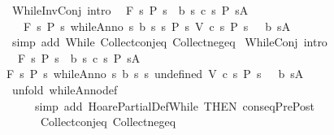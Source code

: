 \begin{isabellebody}
\endisatagproof
{\isafoldproof}%
%
\isadelimproof
\isanewline
%
\endisadelimproof
\isanewline
{}\isamarkupfalse%
\ WhileInvConj\ {\isacharbrackleft}intro{\isacharquery}{\isacharbrackright}{\isacharcolon}\isanewline
\ \ {\isachardoublequoteopen}{\isasymGamma}{\isacharcomma}{\isasymTheta}{\isasymturnstile}\isactrlbsub {\isacharslash}F\isactrlesub \ {\isacharbraceleft}s{\isachardot}\ P\ s\ {\isasymand}\ b\ s{\isacharbraceright}\ c\ {\isacharbraceleft}s{\isachardot}\ P\ s{\isacharbraceright}{\isacharcomma}A\isanewline
\ \ {\isasymLongrightarrow}\ {\isasymGamma}{\isacharcomma}{\isasymTheta}{\isasymturnstile}\isactrlbsub {\isacharslash}F\isactrlesub \ {\isacharbraceleft}s{\isachardot}\ P\ s{\isacharbraceright}\ {\isacharparenleft}whileAnno\ {\isacharbraceleft}s{\isachardot}\ b\ s{\isacharbraceright}\ {\isacharbraceleft}s{\isachardot}\ P\ s{\isacharbraceright}\ V\ c{\isacharparenright}\ {\isacharbraceleft}s{\isachardot}\ P\ s\ {\isasymand}\ {\isasymnot}\ b\ s{\isacharbraceright}{\isacharcomma}A{\isachardoublequoteclose}\isanewline
%
\isadelimproof
\ \ %
\endisadelimproof
%
\isatagproof
{}\isamarkupfalse%
\ {\isacharparenleft}simp\ add{\isacharcolon}\ While\ Collect{\isacharunderscore}conj{\isacharunderscore}eq\ Collect{\isacharunderscore}neg{\isacharunderscore}eq{\isacharparenright}%
\endisatagproof
{\isafoldproof}%
%
\isadelimproof
\isanewline
%
\endisadelimproof
\isanewline
{}\isamarkupfalse%
\ WhileConj\ {\isacharbrackleft}intro{\isacharquery}{\isacharbrackright}{\isacharcolon}\isanewline
\ \ {\isachardoublequoteopen}{\isasymGamma}{\isacharcomma}{\isasymTheta}{\isasymturnstile}\isactrlbsub {\isacharslash}F\isactrlesub \ {\isacharbraceleft}s{\isachardot}\ P\ s\ {\isasymand}\ b\ s{\isacharbraceright}\ c\ {\isacharbraceleft}s{\isachardot}\ P\ s{\isacharbraceright}{\isacharcomma}A\isanewline
\ \ \ \ {\isasymLongrightarrow}\ \isanewline
{\isasymGamma}{\isacharcomma}{\isasymTheta}{\isasymturnstile}\isactrlbsub {\isacharslash}F\isactrlesub \ {\isacharbraceleft}s{\isachardot}\ P\ s{\isacharbraceright}\ {\isacharparenleft}whileAnno\ {\isacharbraceleft}s{\isachardot}\ b\ s{\isacharbraceright}\ {\isacharbraceleft}s{\isachardot}\ undefined{\isacharbraceright}\ V\ c{\isacharparenright}\ {\isacharbraceleft}s{\isachardot}\ P\ s\ {\isasymand}\ {\isasymnot}\ b\ s{\isacharbraceright}{\isacharcomma}A{\isachardoublequoteclose}\isanewline
%
\isadelimproof
\ \ %
\endisadelimproof
%
\isatagproof
{}\isamarkupfalse%
\ {\isacharparenleft}unfold\ whileAnno{\isacharunderscore}def{\isacharparenright}\ \isanewline
\ \ \ \ \ {\isacharparenleft}simp\ add{\isacharcolon}\ HoarePartialDef{\isachardot}While\ {\isacharbrackleft}THEN\ conseqPrePost{\isacharbrackright}\ \isanewline
\ \ \ \ \ \ Collect{\isacharunderscore}conj{\isacharunderscore}eq\ Collect{\isacharunderscore}neg{\isacharunderscore}eq{\isacharparenright}%
\endisatagproof
{\isafoldproof}%
%
\isadelimproof
\isanewline
%
\endisadelimproof
\isanewline
\isanewline
%
\isadelimtheory
\isanewline
%
\endisadelimtheory
%
\isatagtheory
{}\isamarkupfalse%
%
\endisatagtheory
{\isafoldtheory}%
%
\isadelimtheory
%
\endisadelimtheory
%
\end{isabellebody}%
